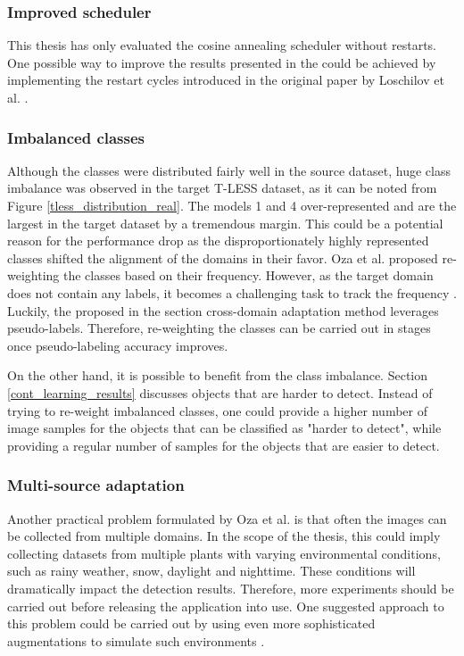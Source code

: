 \documentclass[english, 12pt, a4paper, elec, utf8, a-1b, online]{aaltothesis}
\begin{document}
\subsubsection{Improved scheduler}
This thesis has only evaluated the cosine annealing scheduler without restarts. One possible way to improve the results presented in the  could be achieved by implementing the restart cycles introduced in the original paper by Loschilov et al. \cite{Loshchilov2016}.   


\subsubsection{Imbalanced classes}
Although the classes were distributed fairly well in the source dataset, huge class imbalance was observed in the target T-LESS dataset, as it can be noted from Figure \ref{tless_distribution_real}. The models 1 and 4 over-represented and are the largest in the target dataset by a tremendous margin. This could be a potential reason for the performance drop as the disproportionately highly represented classes shifted the alignment of the domains in their favor. Oza et al. proposed re-weighting the classes based on their frequency. However, as the target domain does not contain any labels, it becomes a challenging task to track the frequency \cite{Oza2021}. Luckily, the proposed in the  section cross-domain adaptation method leverages pseudo-labels. Therefore, re-weighting the classes can be carried out in stages once pseudo-labeling accuracy improves. 

On the other hand, it is possible to benefit from the class imbalance. Section \ref{cont_learning_results} discusses objects that are harder to detect. Instead of trying to re-weight imbalanced classes, one could provide a higher number of image samples for the objects that can be classified as "harder to detect", while providing a regular number of samples for the objects that are easier to detect.

\subsubsection{Multi-source adaptation}
Another practical problem formulated by Oza et al. is that often the images can be collected from multiple domains. In the scope of the thesis, this could imply collecting datasets from multiple plants with varying environmental conditions, such as rainy weather, snow, daylight and nighttime. These conditions will dramatically impact the detection results. Therefore, more experiments should be carried out before releasing the application into use. One suggested approach to this problem could be carried out by using even more sophisticated augmentations to simulate such environments \cite{imgaug}. 
\end{document}
